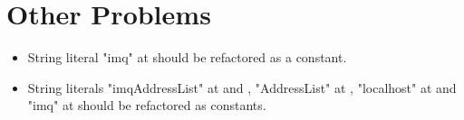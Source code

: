 \chapter{Other Problems}
\begin{itemize}
	\item String literal "imq" at  should be refactored as a constant.	
	\item String literals "imqAddressList" at  and , "AddressList" at , "localhost" at  and "imq" at  should be refactored as constants. 
\end{itemize}
	 
